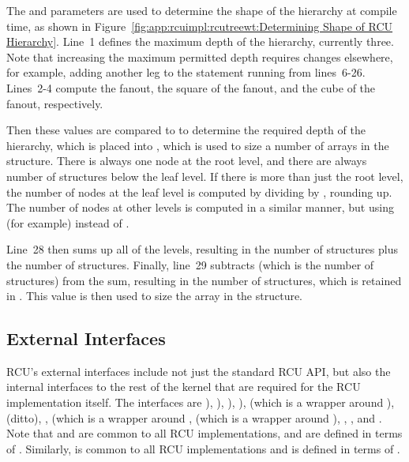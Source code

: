 The  and  parameters are used to
determine the shape of the  hierarchy at compile time,
as shown in
Figure~\ref{fig:app:rcuimpl:rcutreewt:Determining Shape of RCU Hierarchy}.
Line~1 defines the maximum depth of the  hierarchy,
currently three.
Note that increasing the maximum permitted depth requires changes
elsewhere, for example, adding another leg to the 
statement running from lines~6-26.
Lines~2-4 compute the fanout, the square of the fanout, and the cube
of the fanout, respectively.

Then these values are compared to  to determine the required
depth of the  hierarchy, which is placed into
, which is used to size a number of arrays
in the  structure.
There is always one node at the root level, and there are always
 number of  structures below the leaf
level.
If there is more than just the root level, the number of nodes at
the leaf level is computed
by dividing  by , rounding up.
The number of nodes at other levels is computed in a similar manner,
but using (for example)  instead of .

Line~28 then sums up all of the levels, resulting in the number of
 structures plus the number of  structures.
Finally, line~29 subtracts  (which is the number of
 structures) from the sum, resulting in the number
of  structures, which is retained in
.
This value is then used to size the  array in the
 structure.

\subsection{External Interfaces}
\label{app:rcuimpl:rcutreewt:External Interfaces}

RCU's external interfaces include not just the standard RCU API,
but also the internal interfaces to the rest of the kernel that
are required for the RCU implementation itself.
The interfaces are
),
),
),
),
 (which is a wrapper around
),
 (ditto),
,
 (which is a wrapper around
,
 (which is a wrapper around
),
,
, and
.
Note that  and  are
common to all RCU implementations, and are defined in terms of
.
Similarly,  is common to all RCU implementations
and is defined in terms of .

